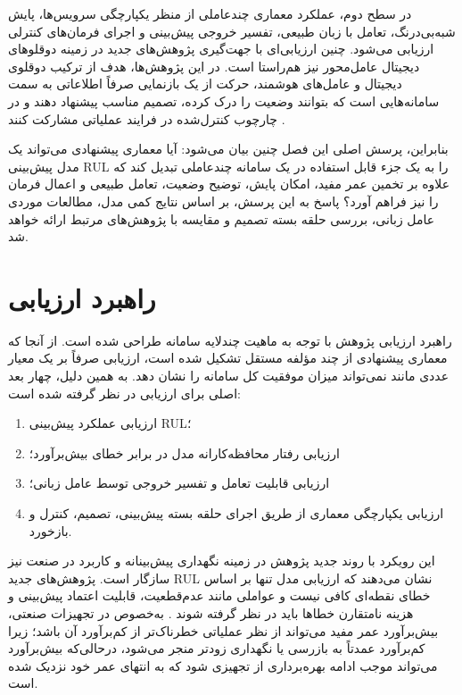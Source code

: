 \documentclass[a4paper,fleqn]{report}
\begin{document}
در سطح دوم، عملکرد معماری چندعاملی از منظر یکپارچگی سرویس‌ها، پایش شبه‌بی‌درنگ، تعامل با زبان طبیعی، تفسیر خروجی پیش‌بینی و اجرای فرمان‌های کنترلی ارزیابی می‌شود. چنین ارزیابی‌ای با جهت‌گیری پژوهش‌های جدید در زمینه دوقلوهای دیجیتال عامل‌محور نیز هم‌راستا است. در این پژوهش‌ها، هدف از ترکیب دوقلوی دیجیتال و عامل‌های هوشمند، حرکت از یک بازنمایی صرفاً اطلاعاتی به سمت سامانه‌هایی است که بتوانند وضعیت را درک کرده، تصمیم مناسب پیشنهاد دهند و در چارچوب کنترل‌شده در فرایند عملیاتی مشارکت کنند \cite{lopez2024madtwin,puiu2025synergies,nicoletti2026humanagentic}.

بنابراین، پرسش اصلی این فصل چنین بیان می‌شود: آیا معماری پیشنهادی می‌تواند یک مدل پیش‌بینی \gls{RUL} را به یک جزء قابل استفاده در یک سامانه چندعاملی تبدیل کند که علاوه بر تخمین عمر مفید، امکان پایش، توضیح وضعیت، تعامل طبیعی و اعمال فرمان را نیز فراهم آورد؟ پاسخ به این پرسش، بر اساس نتایج کمی مدل، مطالعات موردی عامل زبانی، بررسی حلقه بسته تصمیم و مقایسه با پژوهش‌های مرتبط ارائه خواهد شد.

\section{راهبرد ارزیابی}
\label{sec:evaluation-strategy}

راهبرد ارزیابی پژوهش با توجه به ماهیت چندلایه سامانه طراحی شده است. از آنجا که معماری پیشنهادی از چند مؤلفه مستقل تشکیل شده است، ارزیابی صرفاً بر یک معیار عددی مانند  نمی‌تواند میزان موفقیت کل سامانه را نشان دهد. به همین دلیل، چهار بعد اصلی برای ارزیابی در نظر گرفته شده است:

\begin{enumerate}
	\item ارزیابی عملکرد پیش‌بینی \gls{RUL}؛
	\item ارزیابی رفتار محافظه‌کارانه مدل در برابر خطای بیش‌برآورد؛
	\item ارزیابی قابلیت تعامل و تفسیر خروجی توسط عامل زبانی؛
	\item ارزیابی یکپارچگی معماری از طریق اجرای حلقه بسته پیش‌بینی، تصمیم، کنترل و بازخورد.
\end{enumerate}

این رویکرد با روند جدید پژوهش در زمینه نگهداری پیش‌بینانه و کاربرد در صنعت نیز سازگار است. پژوهش‌های جدید \gls{RUL} نشان می‌دهند که ارزیابی مدل تنها بر اساس خطای نقطه‌ای کافی نیست و عواملی مانند عدم‌قطعیت، قابلیت اعتماد پیش‌بینی و هزینه نامتقارن خطاها باید در نظر گرفته شوند \cite{diao2026reliable,hatipoglu2025matrix}. به‌خصوص در تجهیزات صنعتی، بیش‌برآورد عمر مفید می‌تواند از نظر عملیاتی خطرناک‌تر از کم‌برآورد آن باشد؛ زیرا کم‌برآورد عمدتاً به بازرسی یا نگهداری زودتر منجر می‌شود، درحالی‌که بیش‌برآورد می‌تواند موجب ادامه بهره‌برداری از تجهیزی شود که به انتهای عمر خود نزدیک شده است.
\end{document}
